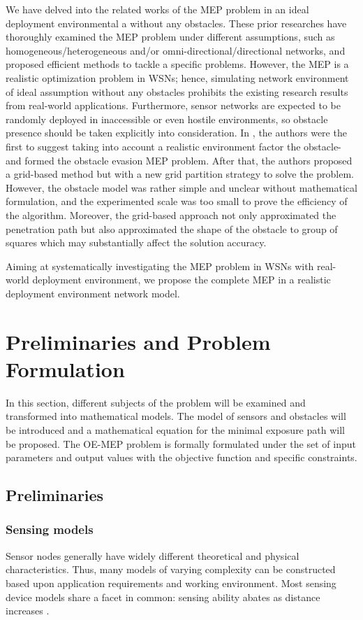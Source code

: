 \documentclass[final]{elsarticle}
\begin{document}
We have delved into the related works of the MEP problem in an ideal deployment environmental a without any obstacles. These prior researches have thoroughly examined the MEP problem under different assumptions, such as homogeneous/heterogeneous and/or omni-directional/directional networks, and proposed efficient methods to tackle a specific problems. However, the MEP is a realistic optimization problem in WSNs; hence, simulating network environment of ideal assumption without any obstacles prohibits the existing research results from real-world applications. Furthermore, sensor networks are expected to be randomly deployed in inaccessible or even hostile environments, so obstacle presence should be taken explicitly into consideration. In \cite{liu2017obstacle}, the authors were the first to suggest taking into account a realistic environment factor the obstacle- and formed the obstacle evasion MEP problem. After that, the authors proposed a grid-based method but with a new grid partition strategy to solve the problem. However, the obstacle model was rather simple and unclear without mathematical formulation, and the experimented scale was too small to prove the efficiency of the algorithm. Moreover, the grid-based approach not only approximated the penetration path but also approximated the shape of the obstacle to group of squares which may substantially affect the solution accuracy.

Aiming at systematically investigating the MEP problem in WSNs with real-world deployment environment, we propose  the complete MEP in a realistic deployment environment network model. 
\section{Preliminaries and Problem Formulation}
In this section, different subjects of the problem will be examined and transformed into mathematical models. The model of sensors and obstacles will be introduced and a mathematical equation for the minimal exposure path will be proposed. The OE-MEP problem is formally formulated under the set of input parameters and output values with the objective function and specific constraints.
\subsection{Preliminaries}
\subsubsection{Sensing models}
Sensor nodes generally have widely different theoretical and physical characteristics. Thus, many models of varying complexity can be constructed based upon application requirements and working environment. Most sensing device models share a facet in common: sensing ability abates as distance increases \cite{megerian2002exposure}.
\end{document}
